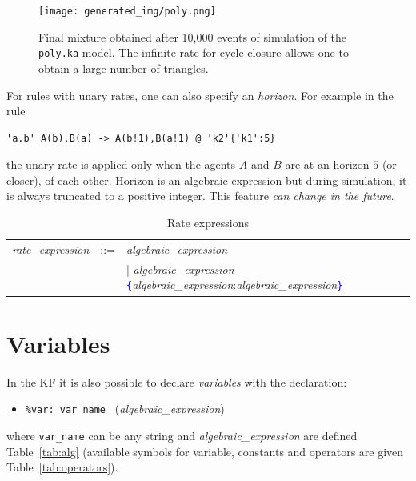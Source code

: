 \documentclass[11pt]{book}
\def\tcb#1{\textcolor{blue}{\ttt{#1}}}
\def\ttt#1{\texttt{#1}}
\def\var#1{{\textquotesingle}#1{\textquotesingle}}
\def\ITE#1{\begin{itemize}#1\end{itemize}}
\begin{document}
\begin{figure}[htbp]
\begin{center}
\texttt{[image: generated\_img/poly.png]}
\caption{Final mixture%
  obtained after 10,000 events of simulation of the \ttt{poly.ka} model. The infinite rate for cycle closure allows one to obtain a large number of triangles.}
\label{fig:species}
\end{center}
\end{figure}

For rules with unary rates, one can also specify an \emph{horizon}.
For example in the rule
\begin{lstlisting}[language=kappa]
'a.b' A(b),B(a) -> A(b!1),B(a!1) @ 'k2'{'k1':5}
\end{lstlisting}
the unary rate is applied only when the agents $A$ and $B$ are at an
horizon $5$ (or closer), of each other. Horizon is an algebraic expression
but during simulation, it is always truncated to a positive integer.
This feature \emph{can change in the future}.

\begin{table}[ht!]
  \centering
  \caption{Rate expressions}
  \begin{tabular}{@{} lcl @{}}
    \textit{rate\_expression} &::=& \textit{algebraic\_expression} \\
&&| \textit{algebraic\_expression} \tcb{\{}\textit{algebraic\_expression}:\textit{algebraic\_expression}\tcb{\}}
    \end{tabular}
  \label{tab:rates}
\end{table}

\section{Variables}\label{sec:var}

In the KF it is also possible to declare \emph{variables} with the declaration:
\ITE{
\item[] \ttt{\%var: \var{var\_name}~} (\textit{algebraic\_expression})
}
where \ttt{var\_name} can be any string and \textit{algebraic\_expression} are defined Table~\ref{tab:alg} (available symbols for variable, constants and operators are given Table~\ref{tab:operators}).
\end{document}
